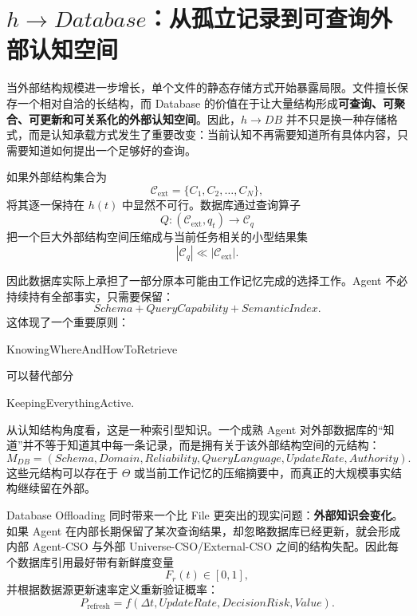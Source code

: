 \section{$h\rightarrow Database$：从孤立记录到可查询外部认知空间}

当外部结构规模进一步增长，单个文件的静态存储方式开始暴露局限。文件擅长保存一个相对自洽的长结构，而 Database 的价值在于让大量结构形成\textbf{可查询、可聚合、可更新和可关系化的外部认知空间}。因此，$h\rightarrow DB$ 并不只是换一种存储格式，而是认知承载方式发生了重要改变：当前认知不再需要知道所有具体内容，只需要知道如何提出一个足够好的查询。

如果外部结构集合为
\begin{equation}
\mathcal C_{\mathrm{ext}}
=
\{C_1,C_2,\ldots,C_N\},
\end{equation}
将其逐一保持在 $h(t)$ 中显然不可行。数据库通过查询算子
\begin{equation}
Q:
(\mathcal C_{\mathrm{ext}},q_t)
\rightarrow
\mathcal C_q
\end{equation}
把一个巨大外部结构空间压缩成与当前任务相关的小型结果集
\begin{equation}
|\mathcal C_q|
\ll
|\mathcal C_{\mathrm{ext}}|.
\end{equation}

因此数据库实际上承担了一部分原本可能由工作记忆完成的选择工作。Agent 不必持续持有全部事实，只需要保留：
\begin{equation}
Schema
+
QueryCapability
+
SemanticIndex.
\end{equation}
这体现了一个重要原则：
\begin{statementbox}
KnowingWhereAndHowToRetrieve
\end{statementbox}
可以替代部分
\begin{statementbox}
KeepingEverythingActive.
\end{statementbox}

从认知结构角度看，这是一种索引型知识。一个成熟 Agent 对外部数据库的“知道”并不等于知道其中每一条记录，而是拥有关于该外部结构空间的元结构：
\begin{equation}
M_{DB}
=
(
Schema,
Domain,
Reliability,
QueryLanguage,
UpdateRate,
Authority
).
\end{equation}
这些元结构可以存在于 $\Theta$ 或当前工作记忆的压缩摘要中，而真正的大规模事实结构继续留在外部。

Database Offloading 同时带来一个比 File 更突出的现实问题：\textbf{外部知识会变化}。如果 Agent 在内部长期保留了某次查询结果，却忽略数据库已经更新，就会形成内部 Agent-CSO 与外部 Universe-CSO/External-CSO 之间的结构失配。因此每个数据库引用最好带有新鲜度变量
\begin{equation}
F_r(t)
\in[0,1],
\end{equation}
并根据数据源更新速率定义重新验证概率：
\begin{equation}
P_{\mathrm{refresh}}
=
f(
\Delta t,
UpdateRate,
DecisionRisk,
Value
).
\end{equation}

